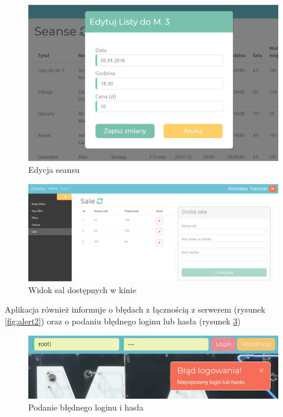 \begin{figure} [H]
	\centering
	\includegraphics[width=1\linewidth]{rozdzial05/interfejs/edytujSeans.png}
	\caption{Edycja seansu}
	\label{fig:screen9}
\end{figure}

\begin{figure} [H]
	\centering
	\includegraphics[width=1\linewidth]{rozdzial05/interfejs/sale.png}
	\caption{Widok sal dostępnych w kinie}
	\label{fig:screen10}
\end{figure}

Aplikacja również informuje o błędach z łącznością z serwerem (rysunek \ref{fig:alert2}) oraz o podaniu błędnego loginu lub hasła (rysunek \ref{fig:alert1})

\begin{figure} [H]
	\centering
	\includegraphics[width=1\linewidth]{rozdzial05/interfejs/alert1.png}
	\caption{Podanie błędnego loginu i hasła}
	\label{fig:alert1}
\end{figure}
		
